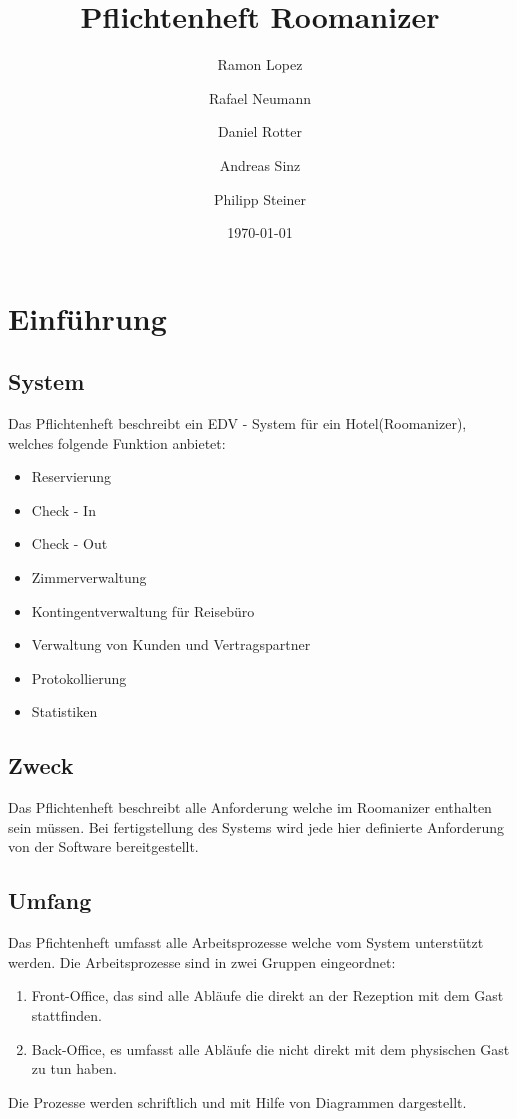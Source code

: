 \documentclass[10pt,a4paper,titlepage]{article}
\begin{document}
\fancyhf{}

\lhead{\leftmark}

\setcounter{secnumdepth}{5}
\setcounter{tocdepth}{3}

\title{Pflichtenheft Roomanizer}
\author{Ramon Lopez \and Rafael Neumann \and Daniel Rotter \and Andreas Sinz \and Philipp Steiner}
\date{\today}
\maketitle

\tableofcontents
\newpage

\section{Einführung}
\subsection{System}
Das Pflichtenheft beschreibt ein EDV - System für ein Hotel(Roomanizer), welches 
folgende Funktion anbietet:
\begin{itemize}
	\item Reservierung
	\item Check - In
	\item Check - Out
	\item Zimmerverwaltung
	\item Kontingentverwaltung für Reisebüro
	\item Verwaltung von Kunden und Vertragspartner
	\item Protokollierung
	\item Statistiken
\end{itemize}
\subsection{Zweck}
 Das Pflichtenheft beschreibt alle Anforderung welche im Roomanizer enthalten sein müssen. Bei fertigstellung des Systems wird jede hier definierte Anforderung von der Software bereitgestellt.
\subsection{Umfang}
Das Pfichtenheft umfasst alle Arbeitsprozesse welche vom System unterstützt werden. 
Die Arbeitsprozesse sind in zwei Gruppen eingeordnet:
\begin{enumerate}
\item Front-Office, das sind alle Abläufe die direkt an der Rezeption mit dem Gast stattfinden.
\item Back-Office, es umfasst alle Abläufe die nicht direkt mit dem physischen Gast zu tun haben.
\end{enumerate}
Die Prozesse werden schriftlich und mit Hilfe von Diagrammen dargestellt.
\end{document}
